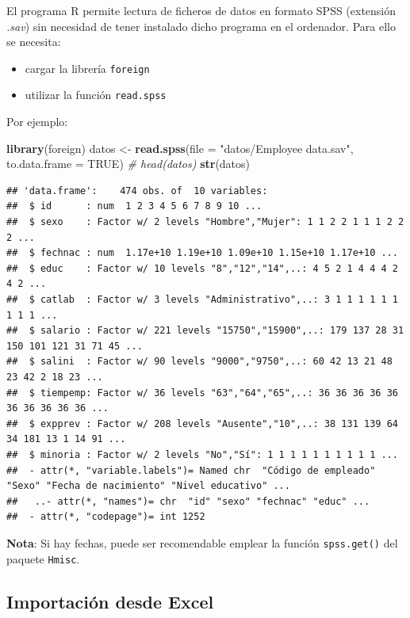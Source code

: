 \documentclass[]{book}
\newenvironment{Shaded}{\begin{snugshade}}{\end{snugshade}}
\newcommand{\CommentTok}[1]{\textcolor[rgb]{0.56,0.35,0.01}{\textit{#1}}}
\newcommand{\DataTypeTok}[1]{\textcolor[rgb]{0.13,0.29,0.53}{#1}}
\newcommand{\KeywordTok}[1]{\textcolor[rgb]{0.13,0.29,0.53}{\textbf{#1}}}
\newcommand{\NormalTok}[1]{#1}
\newcommand{\OtherTok}[1]{\textcolor[rgb]{0.56,0.35,0.01}{#1}}
\newcommand{\StringTok}[1]{\textcolor[rgb]{0.31,0.60,0.02}{#1}}
\begin{document}
El programa R permite
lectura de ficheros de datos en formato SPSS (extensión \emph{.sav}) sin
necesidad de tener instalado dicho programa en el ordenador. Para ello
se necesita:

\begin{itemize}
\item
  cargar la librería \texttt{foreign}
\item
  utilizar la función \texttt{read.spss}
\end{itemize}

Por ejemplo:

\begin{Shaded}
\begin{Highlighting}[]
\KeywordTok{library}\NormalTok{(foreign)}
\NormalTok{datos <-}\StringTok{ }\KeywordTok{read.spss}\NormalTok{(}\DataTypeTok{file =} \StringTok{"datos/Employee data.sav"}\NormalTok{, }\DataTypeTok{to.data.frame =} \OtherTok{TRUE}\NormalTok{)}
\CommentTok{# head(datos)}
\KeywordTok{str}\NormalTok{(datos)}
\end{Highlighting}
\end{Shaded}

\begin{verbatim}
## 'data.frame':    474 obs. of  10 variables:
##  $ id      : num  1 2 3 4 5 6 7 8 9 10 ...
##  $ sexo    : Factor w/ 2 levels "Hombre","Mujer": 1 1 2 2 1 1 1 2 2 2 ...
##  $ fechnac : num  1.17e+10 1.19e+10 1.09e+10 1.15e+10 1.17e+10 ...
##  $ educ    : Factor w/ 10 levels "8","12","14",..: 4 5 2 1 4 4 4 2 4 2 ...
##  $ catlab  : Factor w/ 3 levels "Administrativo",..: 3 1 1 1 1 1 1 1 1 1 ...
##  $ salario : Factor w/ 221 levels "15750","15900",..: 179 137 28 31 150 101 121 31 71 45 ...
##  $ salini  : Factor w/ 90 levels "9000","9750",..: 60 42 13 21 48 23 42 2 18 23 ...
##  $ tiempemp: Factor w/ 36 levels "63","64","65",..: 36 36 36 36 36 36 36 36 36 36 ...
##  $ expprev : Factor w/ 208 levels "Ausente","10",..: 38 131 139 64 34 181 13 1 14 91 ...
##  $ minoria : Factor w/ 2 levels "No","Sí": 1 1 1 1 1 1 1 1 1 1 ...
##  - attr(*, "variable.labels")= Named chr  "Código de empleado" "Sexo" "Fecha de nacimiento" "Nivel educativo" ...
##   ..- attr(*, "names")= chr  "id" "sexo" "fechnac" "educ" ...
##  - attr(*, "codepage")= int 1252
\end{verbatim}

\textbf{Nota}: Si hay fechas, puede ser recomendable emplear la función \texttt{spss.get()} del paquete \texttt{Hmisc}.

\hypertarget{importacion-desde-excel}{%
\subsection{Importación desde Excel}\label{importacion-desde-excel}}
\end{document}
